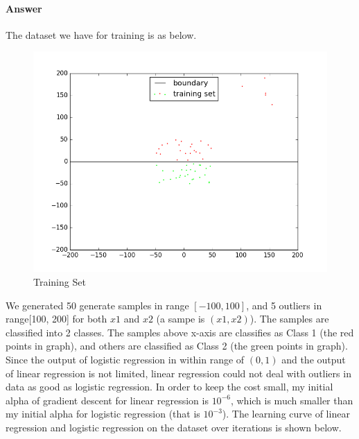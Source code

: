 \documentclass[11pt,twoside]{article}
\begin{document}
\paragraph{Answer}
The dataset we have for training is as below.
\begin{figure}[h]
	\centering
	\includegraphics[scale=0.8]{part5_training_data.png}
	\caption*{Training Set}
\end{figure}
We generated 50 generate samples in range $[-100, 100]$, and 5 outliers in range[100, 200] for both $x1$ and $x2$ (a sampe is $(x1, x2)$). The samples are classified into 2 classes. The samples above x-axis are classifies as Class 1 (the red points in graph), and others are classified as Class 2 (the green points in graph).\\
Since the output of logistic regression in within range of $(0, 1)$ and the output of linear regression is not limited, linear regression could not deal with outliers in data as good as logistic regression. In order to keep the cost small, my initial alpha of gradient descent for linear regression is $10^{-6}$, which is much smaller than my initial alpha for logistic regression (that is $10^{-3}$). The learning curve of linear regression and logistic regression on the dataset over iterations is shown below.
\end{document}
